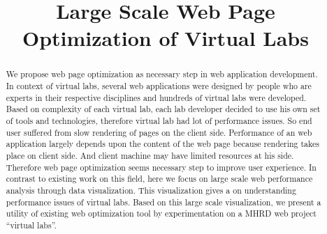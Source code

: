\documentclass[conference]{IEEEtran}
\title{Large Scale Web Page Optimization of Virtual Labs}
\begin{document}
\maketitle

\begin{abstract}
We propose web page optimization as necessary step in web application
development. In context of virtual labs, several web applications were designed by people who are 
experts in their respective disciplines and hundreds of virtual labs were developed.
Based on complexity of each virtual lab, each lab developer decided to use his own 
set of tools and technologies, therefore virtual lab had lot of performance issues.
So end user suffered from slow rendering of pages on the client side.
Performance of an web application largely depends upon the content of the web
page because rendering takes place on client side. 
And client machine may have limited resources at his side. Therefore web page
optimization seems necessary step to improve user experience.
In contrast to existing work on this field, here we focus on large scale web
performance analysis through data visualization. This visualization gives a
on understanding performance issues of virtual labs. Based on this large scale visualization,
we present a utility of existing web optimization tool by experimentation on a
MHRD web project ``virtual labs''.
\end{abstract}
\end{document}
